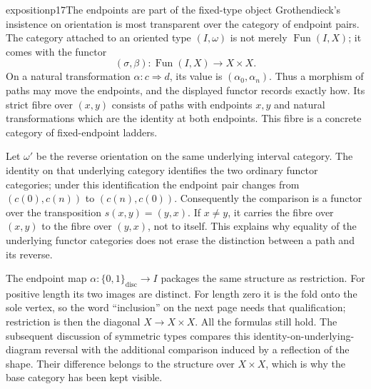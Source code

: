 \begin{dcomment}{exposition}{p17}{The endpoints are part of the fixed-type object}
Grothendieck's insistence on orientation is most transparent over the category of endpoint pairs. The category attached to an oriented type $(I,\omega)$ is not merely $\operatorname{Fun}(I,X)$; it comes with the functor
\[
 (\sigma,\beta):\operatorname{Fun}(I,X)\longrightarrow X\times X.
\]
On a natural transformation $\alpha:c\Rightarrow d$, its value is $(\alpha_0,\alpha_n)$. Thus a morphism of paths may move the endpoints, and the displayed functor records exactly how. Its strict fibre over $(x,y)$ consists of paths with endpoints $x,y$ and natural transformations which are the identity at both endpoints. This fibre is a concrete category of fixed-endpoint ladders.

Let $\omega'$ be the reverse orientation on the same underlying interval category. The identity on that underlying category identifies the two ordinary functor categories; under this identification the endpoint pair changes from $(c(0),c(n))$ to $(c(n),c(0))$. Consequently the comparison is a functor over the transposition $s(x,y)=(y,x)$. If $x\ne y$, it carries the fibre over $(x,y)$ to the fibre over $(y,x)$, not to itself. This explains why equality of the underlying functor categories does not erase the distinction between a path and its reverse.

The endpoint map $\alpha:\{0,1\}_{\mathrm{disc}}\to I$ packages the same structure as restriction. For positive length its two images are distinct. For length zero it is the fold onto the sole vertex, so the word ``inclusion'' on the next page needs that qualification; restriction is then the diagonal $X\to X\times X$. All the formulas still hold. The subsequent discussion of symmetric types compares this identity-on-underlying-diagram reversal with the additional comparison induced by a reflection of the shape. Their difference belongs to the structure over $X\times X$, which is why the base category has been kept visible.
\end{dcomment}

